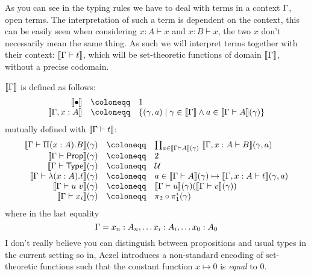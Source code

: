 As you can see in the typing rules we have to deal with terms in a context
\(\Gamma\), \ie open terms. The interpretation of such a term is dependent on the
context, this can be easily seen when considering \(x : A \vdash x\)
and \(x : B \vdash x\), the two \(x\) don't necessarily mean the same thing.
As such we will interpret terms together with their context:
\(\llbracket \Gamma \vdash t \rrbracket\), which will be set-theoretic functions of domain
\(\llbracket \Gamma \rrbracket\), without a precise codomain.

\(\llbracket \Gamma \rrbracket\) is defined as follows:
\[
  \begin{array}{rcl}
    \transl{\ctxempty} &\coloneqq& 1 \\
    \transl{\Ga, x:A} &\coloneqq&
    \{
      (\gamma, a) \mid
      \gamma \in \transl{\Ga} \wedge a \in \transl{\Ga \vdash A}(\gamma)
    \}
  \end{array}
\]
mutually defined with \(\llbracket \Gamma \vdash t \rrbracket\):
\[
  \begin{array}{rcl}
    \transl{\Ga \vdash \Pi (x:A). B}(\gamma)
    &\coloneqq&
    \prod_{a \in \transl{\Ga \vdash A}(\gamma)}\
    \transl{\Ga, x:A \vdash B}(\gamma, a) \\
    \transl{\Ga \vdash \Prop}(\gamma) &\coloneqq& 2 \\
    \transl{\Ga \vdash \Type}(\gamma) &\coloneqq& \mathcal{U} \\
    \transl{\Ga \vdash \lambda (x:A). t}(\gamma)
    &\coloneqq&
    a \in \transl{\Ga \vdash A}(\gamma) \mapsto
    \transl{\Ga, x:A \vdash t}(\gamma,a) \\
    \transl{\Ga \vdash u\ v}(\gamma) &\coloneqq&
    \transl{\Ga \vdash u}(\gamma)(\transl{\Ga \vdash v}(\gamma)) \\
    \transl{\Ga \vdash x_i}(\gamma) &\coloneqq& \pi_2 \circ \pi_1^i (\gamma)
  \end{array}
\]
where in the last equality
\[
  \Gamma = x_n : A_n, \dots x_i : A_i, \dots x_0 : A_0
\]
I don't really believe you can distinguish between propositions and usual types
in the current setting so in\sidecite{aczel1998relating}, Aczel introduces a
non-standard encoding of set-theoretic functions such that the constant function
\(x \mapsto 0\) is \emph{equal} to \(0\).


